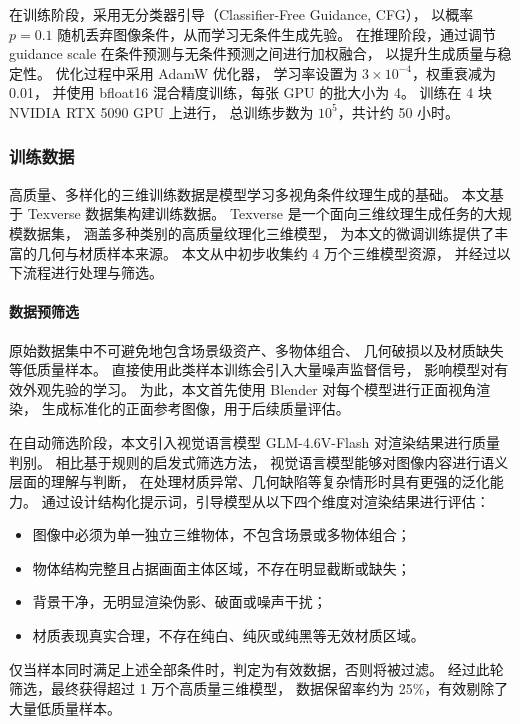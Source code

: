 在训练阶段，采用无分类器引导（Classifier-Free Guidance, CFG）\cite{ho2022classifier}，
以概率 $p = 0.1$ 随机丢弃图像条件，从而学习无条件生成先验。
在推理阶段，通过调节 guidance scale 在条件预测与无条件预测之间进行加权融合，
以提升生成质量与稳定性。
优化过程中采用 AdamW 优化器\cite{loshchilov2017decoupled}，
学习率设置为 $3 \times 10^{-4}$，权重衰减为 0.01，
并使用 bfloat16 混合精度训练，每张 GPU 的批大小为 4。
训练在 4 块 NVIDIA RTX 5090 GPU 上进行，
总训练步数为 $10^5$，共计约 50 小时。

\subsubsection{训练数据}

高质量、多样化的三维训练数据是模型学习多视角条件纹理生成的基础。
本文基于 Texverse 数据集\cite{zhang2025texverse}构建训练数据。
Texverse 是一个面向三维纹理生成任务的大规模数据集，
涵盖多种类别的高质量纹理化三维模型，
为本文的微调训练提供了丰富的几何与材质样本来源。
本文从中初步收集约 4 万个三维模型资源，
并经过以下流程进行处理与筛选。

\paragraph{数据预筛选}

原始数据集中不可避免地包含场景级资产、多物体组合、
几何破损以及材质缺失等低质量样本。
直接使用此类样本训练会引入大量噪声监督信号，
影响模型对有效外观先验的学习。
为此，本文首先使用 Blender 对每个模型进行正面视角渲染，
生成标准化的正面参考图像，用于后续质量评估。

在自动筛选阶段，本文引入视觉语言模型 GLM-4.6V-Flash
对渲染结果进行质量判别。
相比基于规则的启发式筛选方法，
视觉语言模型能够对图像内容进行语义层面的理解与判断，
在处理材质异常、几何缺陷等复杂情形时具有更强的泛化能力。
通过设计结构化提示词，引导模型从以下四个维度对渲染结果进行评估：
\begin{itemize}[noitemsep]
    \item 图像中必须为单一独立三维物体，不包含场景或多物体组合；
    \item 物体结构完整且占据画面主体区域，不存在明显截断或缺失；
    \item 背景干净，无明显渲染伪影、破面或噪声干扰；
    \item 材质表现真实合理，不存在纯白、纯灰或纯黑等无效材质区域。
\end{itemize}
仅当样本同时满足上述全部条件时，判定为有效数据，否则将被过滤。
经过此轮筛选，最终获得超过 1 万个高质量三维模型，
数据保留率约为 25\%，有效剔除了大量低质量样本。

